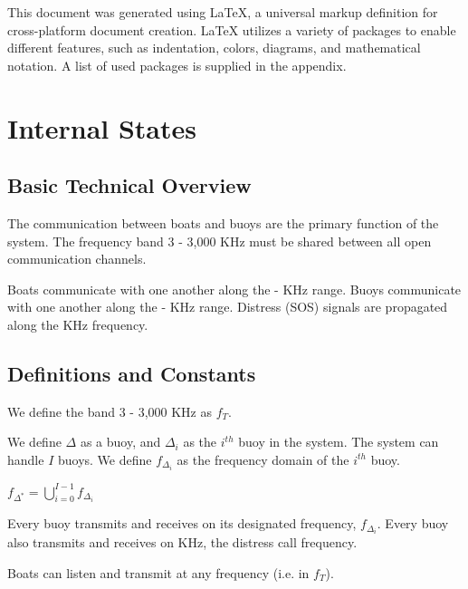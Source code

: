 \documentclass{article}
\begin{document}
		\bigskip

		This document was generated using LaTeX, a universal markup definition for cross-platform document creation. LaTeX utilizes a variety of packages to enable different features, such as indentation, colors, diagrams, and mathematical notation. A list of used packages is supplied in the appendix.


\section{Internal States} %

	\subsection{Basic Technical Overview}

		The communication between boats and buoys are the primary function of the system. The frequency band 3 - 3,000 KHz must be shared between all open communication channels.

		\bigskip

		Boats communicate with one another along the \fbl - \fbh KHz range. Buoys communicate with one another along the \fdl - \fdh KHz range. Distress (SOS) signals are propagated along the \fsos KHz frequency.

	\subsection{Definitions and Constants}

		We define the band 3 - 3,000 KHz as $f_{T}$.

		\bigskip

		We define $\Delta$ as a buoy, and $\Delta_{i}$ as the $i^{th}$ buoy in the system. The system can handle $I$ buoys. We define $f_{\Delta_{i}}$ as the frequency domain of the $i^{th}$ buoy.

		\bigskip
		\centering

		$f_{\Delta^{*}} = \bigcup_{i=0}^{I-1}f_{\Delta_{i}}$

		\flushleft
		\bigskip

		Every buoy transmits and receives on its designated frequency, $f_{\Delta_{i}}$. Every buoy also transmits and receives on \fsos KHz, the distress call frequency.

		\bigskip

		Boats can listen and transmit at any frequency (i.e. in $f_{T}$).
\end{document}

